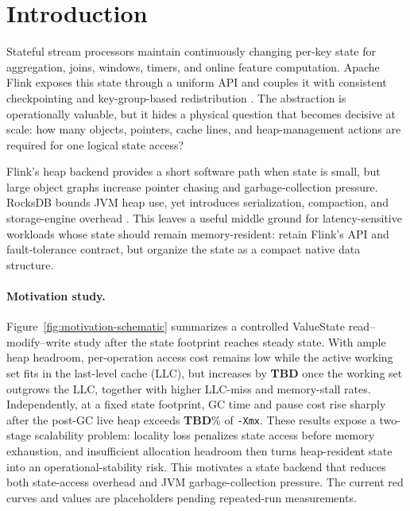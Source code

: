 \documentclass[sigconf]{acmart}
\begin{document}
\section{Introduction}

Stateful stream processors maintain continuously changing per-key state for aggregation, joins, windows, timers, and online feature computation. Apache Flink exposes this state through a uniform API and couples it with consistent checkpointing and key-group-based redistribution \cite{carbone2015flink,carbone2017statemanagement}. The abstraction is operationally valuable, but it hides a physical question that becomes decisive at scale: how many objects, pointers, cache lines, and heap-management actions are required for one logical state access?

Flink's heap backend provides a short software path when state is small, but large object graphs increase pointer chasing and garbage-collection pressure. RocksDB bounds JVM heap use, yet introduces serialization, compaction, and storage-engine overhead \cite{rocksdb}. This leaves a useful middle ground for latency-sensitive workloads whose state should remain memory-resident: retain Flink's API and fault-tolerance contract, but organize the state as a compact native data structure.

\begingroup
\color{red}
\paragraph{Motivation study.}
Figure~\ref{fig:motivation-schematic} summarizes a controlled ValueState read--modify--write study after the state footprint reaches steady state. With ample heap headroom, per-operation access cost remains low while the active working set fits in the last-level cache (LLC), but increases by \textbf{TBD} once the working set outgrows the LLC, together with higher LLC-miss and memory-stall rates. Independently, at a fixed state footprint, GC time and pause cost rise sharply after the post-GC live heap exceeds \textbf{TBD}\% of \texttt{-Xmx}. These results expose a two-stage scalability problem: locality loss penalizes state access before memory exhaustion, and insufficient allocation headroom then turns heap-resident state into an operational-stability risk. This motivates a state backend that reduces both state-access overhead and JVM garbage-collection pressure. The current red curves and values are placeholders pending repeated-run measurements.
\endgroup
\end{document}
